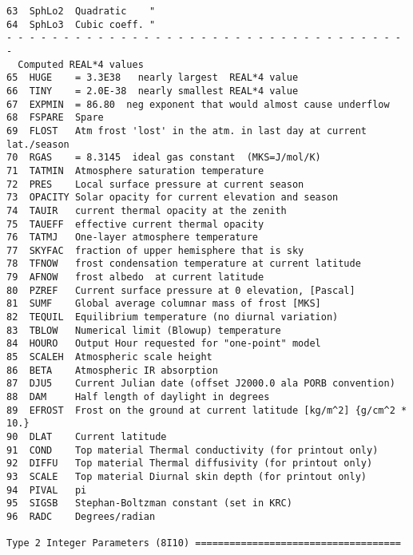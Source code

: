 \documentclass[draft]{article}  %
\begin{document}
\begin{verbatim}
63  SphLo2  Quadratic    "
64  SphLo3  Cubic coeff. "
- - - - - - - - - - - - - - - - - - - - - - - - - - - - - - - - - - - -
  Computed REAL*4 values 
65  HUGE    = 3.3E38   nearly largest  REAL*4 value
66  TINY    = 2.0E-38  nearly smallest REAL*4 value
67  EXPMIN  = 86.80  neg exponent that would almost cause underflow
68  FSPARE  Spare
69  FLOST   Atm frost 'lost' in the atm. in last day at current lat./season
70  RGAS    = 8.3145  ideal gas constant  (MKS=J/mol/K)
71  TATMIN  Atmosphere saturation temperature
72  PRES    Local surface pressure at current season
73  OPACITY Solar opacity for current elevation and season
74  TAUIR   current thermal opacity at the zenith
75  TAUEFF  effective current thermal opacity 
76  TATMJ   One-layer atmosphere temperature
77  SKYFAC  fraction of upper hemisphere that is sky
78  TFNOW   frost condensation temperature at current latitude
79  AFNOW   frost albedo  at current latitude
80  PZREF   Current surface pressure at 0 elevation, [Pascal]
81  SUMF    Global average columnar mass of frost [MKS]
82  TEQUIL  Equilibrium temperature (no diurnal variation)
83  TBLOW   Numerical limit (Blowup) temperature
84  HOURO   Output Hour requested for "one-point" model
85  SCALEH  Atmospheric scale height
86  BETA    Atmospheric IR absorption
87  DJU5    Current Julian date (offset J2000.0 ala PORB convention)
88  DAM     Half length of daylight in degrees
89  EFROST  Frost on the ground at current latitude [kg/m^2] {g/cm^2 * 10.} 
90  DLAT    Current latitude
91  COND    Top material Thermal conductivity (for printout only)
92  DIFFU   Top material Thermal diffusivity (for printout only)
93  SCALE   Top material Diurnal skin depth (for printout only)
94  PIVAL   pi
95  SIGSB   Stephan-Boltzman constant (set in KRC)
96  RADC    Degrees/radian

Type 2 Integer Parameters (8I10) ====================================


\end{verbatim}
\end{document}
